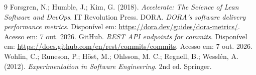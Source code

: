 \documentclass[12pt]{article}
\begin{document}






\begin{thebibliography}{9}
Forsgren, N.; Humble, J.; Kim, G. (2018).
\textit{Accelerate: The Science of Lean Software and DevOps}.
IT Revolution Press.
DORA. \textit{DORA's software delivery performance metrics}.
Disponível em: \url{https://dora.dev/guides/dora-metrics/}.
Acesso em: 7 out. 2026.
GitHub. \textit{REST API endpoints for commits}.
Disponível em: \url{https://docs.github.com/en/rest/commits/commits}.
Acesso em: 7 out. 2026.
Wohlin, C.; Runeson, P.; H\"ost, M.; Ohlsson, M. C.; Regnell, B.; Wessl\'en,
A. (2012). \textit{Experimentation in Software Engineering}. 2nd ed.
Springer.
\end{thebibliography}
\end{document}
